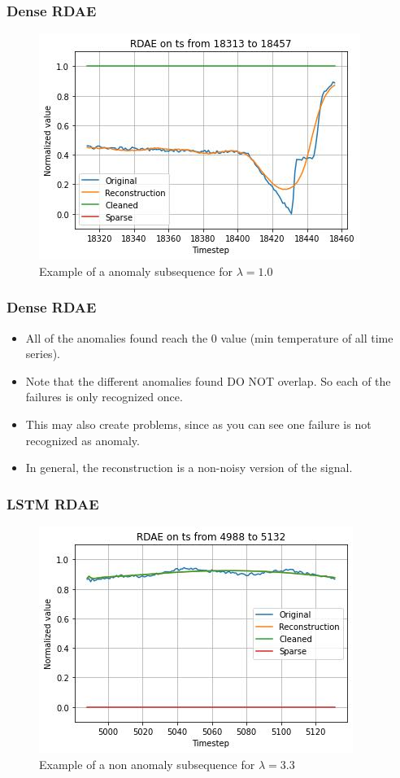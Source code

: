 \documentclass{beamer}
\theoremstyle{plain}
\theoremstyle{definition}
\theoremstyle{remark}
\begin{document}
\begin{frame}
	\frametitle{Dense RDAE}
	\begin{figure}
		\centering
		\includegraphics[width=0.7\linewidth]{Images/lam1.0ts_anomalyzoom18313.jpg}
		\caption[]{Example of a anomaly subsequence for $\lambda=1.0$}
	\end{figure}
\end{frame}

\begin{frame}
	\frametitle{Dense RDAE}
	\begin{itemize}
		\item All of the anomalies found reach the $0$ value (min temperature of all time series).
		\item Note that the different anomalies found DO NOT overlap. So each of the failures is only recognized once.
		\item This may also create problems, since as you can see one failure is not recognized as anomaly.
		\item In general, the reconstruction is a non-noisy version of the signal.
	\end{itemize}
\end{frame}

\begin{frame}
	\frametitle{LSTM RDAE}
	\begin{figure}
		\centering
		\includegraphics[width=0.7\linewidth]{Images/LSTMlam3.3ts_non_anomaly4988.jpg}
		\caption[]{Example of a non anomaly subsequence for $\lambda=3.3$}
	\end{figure}
\end{frame}
\end{document}
